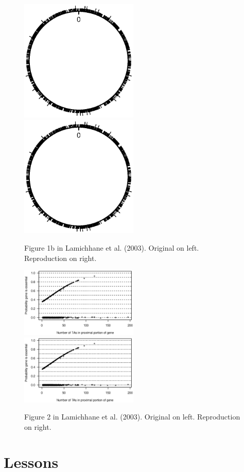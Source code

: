 \begin{figure}
\includegraphics[viewport=179 299 438 517, width=0.50\textwidth]{../talk/Figs/circlefig.ps}
\hfill
\includegraphics[viewport=179 299 438 517, width=0.50\textwidth]{../reproduction/Figs/circlefig.ps}

\caption{Figure 1b in Lamichhane et al. (2003). Original on left. Reproduction on right.}
\end{figure}

\begin{figure}
\includegraphics[viewport=44 245 525 508, width=0.50\textwidth]{../original/Nov02/R/Figs/fig2.ps}
\hfill
\includegraphics[viewport=44 245 525 508, width=0.50\textwidth]{../reproduction/Figs/fig2.ps}

\caption{Figure 2 in Lamichhane et al. (2003). Original on left. Reproduction on right.}
\end{figure}


\section{Lessons}
